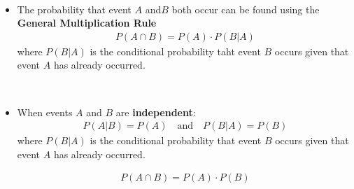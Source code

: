 \documentclass[Main.tex]{subfiles}
\begin{document}
	\begin{exercise} \hfill \\
		\begin{itemize}	
			\item The probability that event $A$ and$B$ both occur can be found using the \textbf{General Multiplication Rule}
			\begin{subequations}
				\begin{align}
				P(A\cap B)=P(A)\cdot P(B|A)
				\end{align}
			\end{subequations}	
			where $P(B|A)$ is the conditional probability taht event $B$ occurs given that event $A$ has already occurred.		
		\end{itemize}
	\end{exercise}	
	
	\begin{exercise} \hfill \\
		\begin{itemize}	
			\item When events $A$ and $B$ are \textbf{independent}:
			\begin{subequations}
				\begin{align}
				P(A|B)=P(A)\quad\text{and}\quad P(B|A)=P(B)
				\end{align}
			\end{subequations}	
			where $P(B|A)$ is the conditional probability that event $B$ occurs given that event $A$ has already occurred.\\
			\begin{definition}
			\begin{subequations}
				\begin{align}
				P(A\cap B)=P(A)\cdot P(B)
				\end{align}
			\end{subequations}	
			\end{definition} \hfill					
		\end{itemize}
	\end{exercise}								
\end{document}
